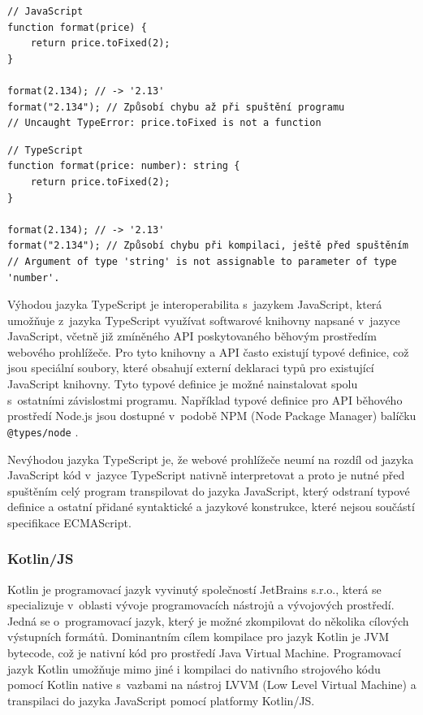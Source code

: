 \begin{lstlisting}[label={code:javascript-bad}, caption={Ukázka kódu s~neplatným typem parametru v~jazyce JavaScript (vlastní zpracování)}]
// JavaScript
function format(price) {
    return price.toFixed(2);
}

format(2.134); // -> '2.13'
format("2.134"); // Způsobí chybu až při spuštění programu
// Uncaught TypeError: price.toFixed is not a function
\end{lstlisting}

\begin{lstlisting}[label={code:typescript-good}, caption={Ukázka kódu s~neplatným typem parametru v~jazyce TypeScript (vlastní zpracování)}]
// TypeScript
function format(price: number): string {
    return price.toFixed(2);
}

format(2.134); // -> '2.13'
format("2.134"); // Způsobí chybu při kompilaci, ještě před spuštěním
// Argument of type 'string' is not assignable to parameter of type 'number'.
\end{lstlisting}

Výhodou jazyka TypeScript je interoperabilita s~jazykem JavaScript, která umožňuje z~jazyka TypeScript využívat softwarové knihovny napsané v~jazyce JavaScript, včetně již zmíněného API poskytovaného běhovým prostředím webového prohlížeče. Pro tyto knihovny a API často existují typové definice, což jsou speciální soubory, které obsahují externí deklaraci typů pro existující JavaScript knihovny. Tyto typové definice je možné nainstalovat spolu s~ostatními závislostmi programu. Například typové definice pro API běhového prostředí Node.js jsou dostupné v~podobě NPM (Node Package Manager) balíčku \verb|@types/node| \cite[kap. 2]{cherny_programming_2019}.

Nevýhodou jazyka TypeScript je, že webové prohlížeče neumí na rozdíl od jazyka JavaScript kód v~jazyce TypeScript nativně interpretovat a proto je nutné před spuštěním celý program transpilovat do jazyka JavaScript, který odstraní typové definice a ostatní přidané syntaktické a jazykové konstrukce, které nejsou součástí specifikace ECMAScript. 

\subsubsection{Kotlin/JS}\label{sec:kotlin}

Kotlin je programovací jazyk vyvinutý společností JetBrains s.r.o., která se specializuje v~oblasti vývoje programovacích nástrojů a vývojových prostředí. Jedná se o~programovací jazyk, který je možné zkompilovat do několika cílových výstupních formátů. Dominantním cílem kompilace pro jazyk Kotlin je JVM bytecode, což je nativní kód pro prostředí Java Virtual Machine. Programovací jazyk Kotlin umožňuje mimo jiné i kompilaci do nativního strojového kódu pomocí Kotlin native s~vazbami na nástroj LVVM (Low Level Virtual Machine) a transpilaci do jazyka JavaScript pomocí platformy Kotlin/JS.

